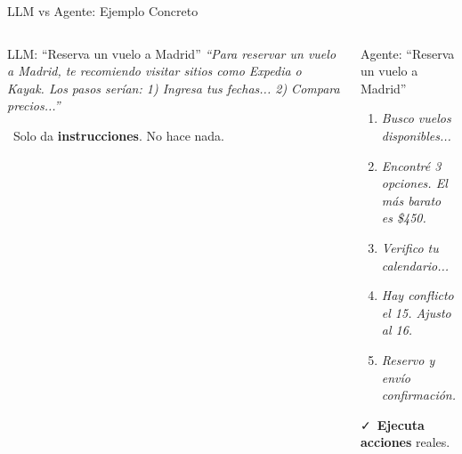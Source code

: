 \documentclass[aspectratio=169]{beamer}
\begin{document}
\begin{frame}{LLM vs Agente: Ejemplo Concreto}
    \begin{columns}[t]
        \begin{block}{LLM: ``Reserva un vuelo a Madrid''}
            \textit{``Para reservar un vuelo a Madrid, te recomiendo visitar sitios como Expedia o Kayak. Los pasos serían: 1) Ingresa tus fechas... 2) Compara precios...''}
            
            \vspace{0.2cm}
            \faExclamationTriangle\ Solo da \textbf{instrucciones}. No hace nada.
        \end{block}
        
        \begin{block}{Agente: ``Reserva un vuelo a Madrid''}
            \begin{enumerate}
                \scriptsize
                \item \textit{Busco vuelos disponibles...} \faSearch
                \item \textit{Encontré 3 opciones. El más barato es \$450.} \faPlane
                \item \textit{Verifico tu calendario...} \faCalendar
                \item \textit{Hay conflicto el 15. Ajusto al 16.} \faExchangeAlt
                \item \textit{Reservo y envío confirmación.} \faEnvelope
            \end{enumerate}
            
            \vspace{0.1cm}
            \faCheck\ \textbf{Ejecuta acciones} reales.
        \end{block}
    \end{columns}
\end{frame}
\end{document}
